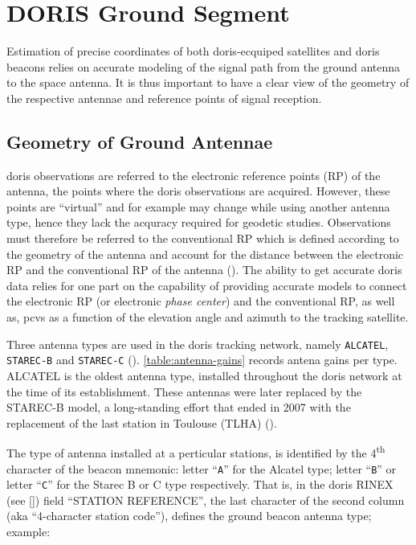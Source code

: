 \section{DORIS Ground Segment}\label{sec:doris-ground-segment}

Estimation of precise coordinates of both \gls{doris}-ecquiped satellites and 
\gls{doris} beacons relies on accurate modeling of the signal path from the
ground antenna to the space antenna. It is thus important to have a clear view of 
the geometry of the respective antennae and reference points of signal reception.

\subsection{Geometry of Ground Antennae}\label{ssec:antenae-geometry}
\gls{doris} observations are referred to the electronic reference points (RP) of the 
antenna, the points where the \gls{doris} observations are acquired. However, 
these points are ``virtual'' and for example may change while using another antenna 
type, hence they lack the acquracy required for geodetic studies.
Observations must therefore be referred to the conventional RP which is defined 
according to the geometry of the antenna and account for the distance between 
the electronic RP and the conventional RP of the antenna (\cite{Tourain2016}). 
The ability to get accurate \gls{doris} data relies 
for one part on the capability of providing accurate models to connect the 
electronic RP (or electronic \emph{phase center}) and the conventional RP, as well 
as, \glspl{pcv} as a function of the elevation angle and azimuth to the tracking 
satellite.

Three antenna types are used in the \gls{doris} tracking network, namely 
\texttt{ALCATEL}, \texttt{STAREC-B} and \texttt{STAREC-C} (\cite{Saunier2016}). 
\autoref{table:antenna-gains} records antena gains per type. 
ALCATEL is the oldest antenna type, installed throughout the \gls{doris} network 
at the time of its establishment. These antennas were later replaced by the STAREC-B 
model, a long-standing effort that ended in 2007 with the replacement of the last 
station in Toulouse (TLHA) (\cite{Stepanek2022}).

The type of antenna installed at a perticular stations, is identified by the 
4\textsuperscript{th} character of the beacon mnemonic: letter ``\texttt{A}'' for the 
Alcatel type; letter ``\texttt{B}'' or letter ``\texttt{C}'' for the Starec B 
or C type respectively. That is, in the \gls{doris} RINEX (see \autoref{}) 
field ``STATION REFERENCE'', 
the last character of the second column (aka ``4-character station code''), 
defines the ground beacon antenna type; example:

